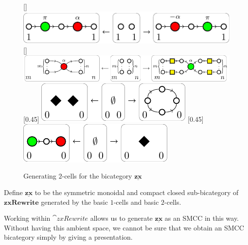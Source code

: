 \begin{figure}[h]
{\begin{minipage}{\textwidth}
{			}
			\linebreak
			[\textwidth]{%
				\includegraphics[scale=0.75]{InclGrphx--2cell--pi_commutation}
			}
			\linebreak
			[\textwidth]{%
				\includegraphics[scale=0.75]{InclGrphx--2cell--color_change}
			}
			\linebreak
			[0.45\textwidth]{%
				\includegraphics[scale=0.75]{InclGrphx--2cell--loop}
			}
			[0.45\textwidth]{%
				\includegraphics[scale=0.75]{InclGrphx--2cell--diamond}
			}
		\end{minipage}
	}
	\caption{Generating $2$-cells for the bicategory $\underline{\mathbf{zx}}$}
	\label{fig:ZX_2cells_generators}
\end{figure}

\begin{defn}
	\label{def:zx_bicat}
	Define $\underline{\mathbf{zx}}$ to be 
	the symmetric monoidal and 
	compact closed sub-bicategory 
	of $\mathbf{zxRewrite}$ generated by 
	the basic $1$-cells and basic $2$-cells.
\end{defn}

Working within $\cat{zxRewrite}$
allows us to generate 
$\underline{\mathbf{zx}}$
as an SMCC in this way.
Without having this ambient space,
we cannot be sure that we 
obtain an SMCC bicategory simply
by giving a presentation.


